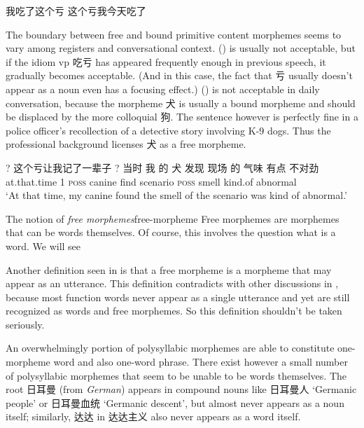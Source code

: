 \documentclass[UTF8, a4paper, oneside, scheme=plain]{ctexrep}
\newcommand*{\citesec}[1]{\S~{#1}}
\newcommand*{\term}[1]{\emph{#1}}
\newcommand{\corpus}[1]{\emph{#1}}
\newcommand{\translate}[1]{`#1'}
\newcommand*{\category}[1]{\textsc{#1}}
\begin{document}
\begin{exe}
    \ex\label{ex:pos.morpheme.chikui} \begin{xlist}
        \ex 我吃了这个亏
        \ex 这个亏我今天吃了
    \end{xlist}
\end{exe}

The boundary between free and bound primitive content morphemes 
seems to vary among registers and conversational context. 
() is usually not acceptable,
but if the idiom \acs{vp} 吃亏 has appeared frequently enough
in previous speech, 
it gradually becomes acceptable.
(And in this case, the fact that 亏 usually doesn't appear as a noun 
even has a focusing effect.)
() is not acceptable in daily conversation,
because the morpheme 犬 is usually a bound morpheme 
and should be displaced by the more colloquial 狗.
The sentence however is perfectly fine in 
a police officer's recollection of a detective story involving K-9 dogs.
Thus the professional background licenses 犬 as a free morpheme.

\begin{exe}
    \ex\label{ex:pos.morpheme.kui-2} 
    ? 这个亏让我记了一辈子
    \ex\label{ex:pos.morpheme.quan} 
    \gll ? 当时 我 的 犬 发现 现场 的 气味 有点 不对劲 \\
    {} at.that.time 1 \category{poss} canine find scenario \category{poss} smell kind.of abnormal \\
    \glt \translate{At that time, my canine found the smell of the scenario was kind of abnormal.}
\end{exe}

\begin{infobox}{The notion of \term{free morphemes}}{free-morpheme}
    Free morphemes are morphemes that can be words themselves.
    Of course, this involves the question what is a word. 
    We will see 

    Another definition seen in \citet[\citesec{1.1.2}]{zhudexigrammar}
    is that a free morpheme is a morpheme that may appear as an utterance.
    This definition contradicts with other discussions in \citet{zhudexigrammar},
    because most function words never appear as a single utterance
    and yet are still recognized as words
    and free morphemes.
    So this definition shouldn't be taken seriously.
\end{infobox}

An overwhelmingly portion of polysyllabic morphemes 
are able to constitute one-morpheme word and also one-word phrase.
There exist however a small number of polysyllabic morphemes 
that seem to be unable to be words themselves. 
The root 日耳曼 (from \corpus{German}) 
appears in compound nouns like 日耳曼人 \translate{Germanic people} 
or 日耳曼血统 \translate{Germanic descent}, 
but almost never appears as a noun itself; 
similarly, 达达 in 达达主义 also never appears as a word itself.
\end{document}
